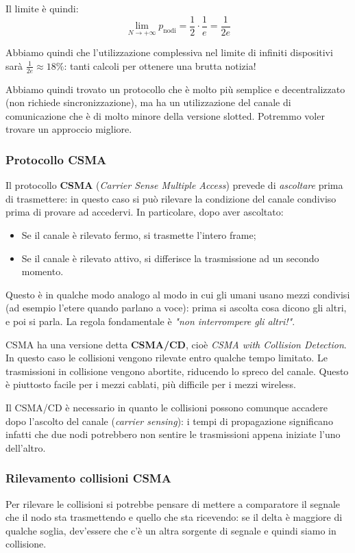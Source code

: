 \documentclass[a4paper,11pt]{article}
\begin{document}
Il limite è quindi:
$$
\lim_{N \rightarrow + \infty} p_\text{nodi} = \frac{1}{2} \cdot \frac{1}{e} = \frac{1}{2e}
$$

Abbiamo quindi che l'utilizzazione complessiva nel limite di infiniti dispositivi sarà $\frac{1}{2e} \approx 18\%$: tanti calcoli per ottenere una brutta notizia!

\par\medskip

Abbiamo quindi trovato un protocollo che è molto più semplice e decentralizzato (non richiede sincronizzazione), ma ha un utilizzazione del canale di comunicazione che è di molto minore della versione slotted.
Potremmo voler trovare un approccio migliore.

\subsubsection{Protocollo CSMA}
Il protocollo \textbf{CSMA} (\textit{Carrier Sense Multiple Access}) prevede di \textit{ascoltare} prima di trasmettere: in questo caso si può rilevare la condizione del canale condiviso prima di provare ad accedervi.
In particolare, dopo aver ascoltato:
\begin{itemize}
	\item Se il canale è rilevato fermo, si trasmette l'intero frame;
	\item Se il canale è rilevato attivo, si differisce la trasmissione ad un secondo momento.
\end{itemize}

Questo è in qualche modo analogo al modo in cui gli umani usano mezzi condivisi (ad esempio l'etere quando parlano a voce): prima si ascolta cosa dicono gli altri, e poi si parla. La regola fondamentale è \textit{"non interrompere gli altri!"}.

CSMA ha una versione detta \textbf{CSMA/CD}, cioè \textit{CSMA with Collision Detection}.
In questo caso le collisioni vengono rilevate entro qualche tempo limitato.
Le trasmissioni in collisione vengono abortite, riducendo lo spreco del canale.
Questo è piuttosto facile per i mezzi cablati, più difficile per i mezzi wireless. 

Il CSMA/CD è necessario in quanto le collisioni possono comunque accadere dopo l'ascolto del canale (\textit{carrier sensing}): i tempi di propagazione significano infatti che due nodi potrebbero non sentire le trasmissioni appena iniziate l'uno dell'altro.

\subsubsection{Rilevamento collisioni CSMA}
Per rilevare le collisioni si potrebbe pensare di mettere a comparatore il segnale che il nodo sta trasmettendo e quello che sta ricevendo: se il delta è maggiore di qualche soglia, dev'essere che c'è un altra sorgente di segnale e quindi siamo in collisione.
\end{document}
